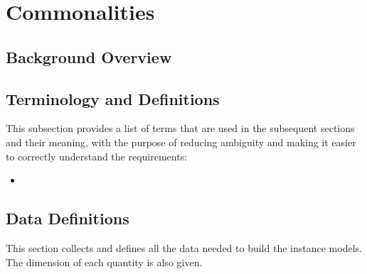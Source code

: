 \documentclass[12pt]{article}
\begin{document}
\section{Commonalities}

\subsection{Background Overview} \label{Sec_Background}

\subsection{Terminology and  Definitions}

This subsection provides a list of terms that are used in the subsequent
sections and their meaning, with the purpose of reducing ambiguity and making it
easier to correctly understand the requirements:

\begin{itemize}

\item 

\end{itemize}

\subsection{Data Definitions} \label{sec_datadef}

This section collects and defines all the data needed to build the instance
models. The dimension of each quantity is also given.  
~\newline
\end{document}
